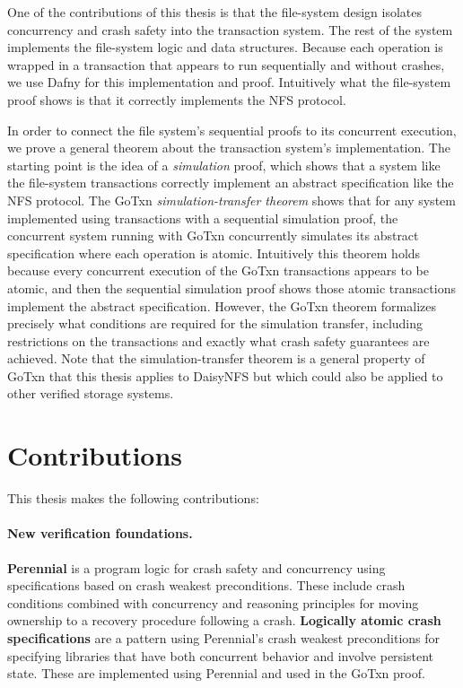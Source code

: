 One of the contributions of this thesis is that the file-system design isolates
concurrency and crash safety into the transaction system. The rest of the system
implements the file-system logic and data structures. Because each operation is
wrapped in a transaction that appears to run sequentially and without crashes,
we use Dafny for this implementation and proof. Intuitively what the file-system
proof shows is that it correctly implements the NFS protocol.

In order to connect the file system's sequential proofs to its concurrent
execution, we prove a general theorem about the transaction system's
implementation. The starting point is the idea of a \emph{simulation} proof,
which shows that a system like the file-system transactions correctly implement an
abstract specification like the NFS protocol. The GoTxn
\emph{simulation-transfer theorem} shows that for any system implemented using
transactions with a sequential simulation proof, the concurrent system running
with GoTxn concurrently simulates its abstract specification where each
operation is atomic. Intuitively this theorem holds because every concurrent
execution of the GoTxn transactions appears to be atomic, and then the
sequential simulation proof shows those atomic transactions implement the
abstract specification. However, the GoTxn theorem formalizes precisely what
conditions are required for the simulation transfer, including restrictions on
the transactions and exactly what crash safety guarantees are achieved. Note
that the simulation-transfer theorem is a general property of GoTxn that this
thesis applies to DaisyNFS but which could also be applied to other verified
storage systems.

\section{Contributions}
\label{sec:intro:contributions}

This thesis makes the following contributions:

\paragraph{New verification foundations.}
\textbf{Perennial} is a program logic for crash safety
and concurrency using specifications based on crash weakest
preconditions. These include crash conditions combined with concurrency
and reasoning principles for moving ownership to a recovery procedure
following a crash. \textbf{Logically atomic crash specifications} are a
pattern using Perennial's crash weakest preconditions for specifying
libraries that have both concurrent behavior and involve persistent
state. These are implemented using Perennial and used in the GoTxn
proof.

